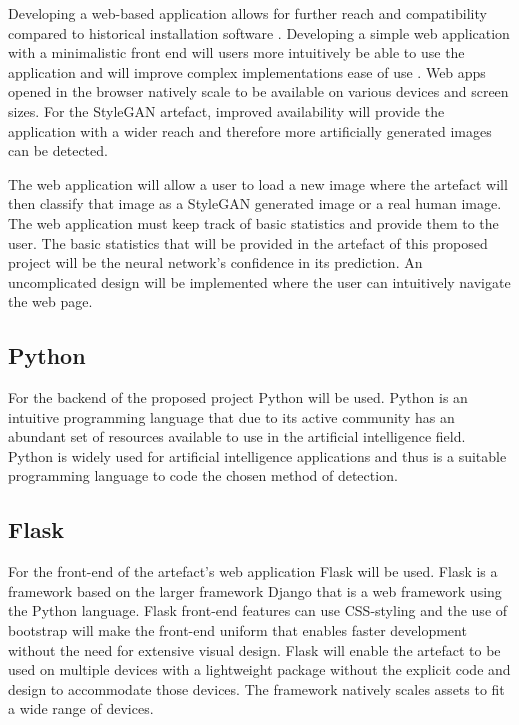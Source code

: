 Developing a web-based application allows for further reach and compatibility compared to historical installation software \citep{murugesan2011}. Developing a simple web application with a minimalistic front end will users more intuitively be able to use the application and will improve complex implementations ease of use \citep{murugesan2011}. Web apps opened in the browser natively scale to be available on various devices and screen sizes. For the StyleGAN artefact, improved availability will provide the application with a wider reach and therefore more artificially generated images can be detected. 

The web application will allow a user to load a new image where the artefact will then classify that image as a StyleGAN generated image or a real human image. The web application must keep track of basic statistics and provide them to the user. The basic statistics that will be provided in the artefact of this proposed project will be the neural network's confidence in its prediction. An uncomplicated design will be implemented where the user can intuitively navigate the web page.

\subsection{Python}

For the backend of the proposed project Python will be used. Python is an intuitive programming language that due to its active community has an abundant set of resources available to use in the artificial intelligence field. Python is widely used for artificial intelligence applications and thus is a suitable programming language to code the chosen method of detection.

\subsection{Flask}

For the front-end of the artefact’s web application Flask will be used. Flask is a framework based on the larger framework Django that is a web framework using the Python language. Flask front-end features can use CSS-styling and the use of bootstrap will make the front-end uniform that enables faster development without the need for extensive visual design. Flask will enable the artefact to be used on multiple devices with a lightweight package without the explicit code and design to accommodate those devices. The framework natively scales assets to fit a wide range of devices.

